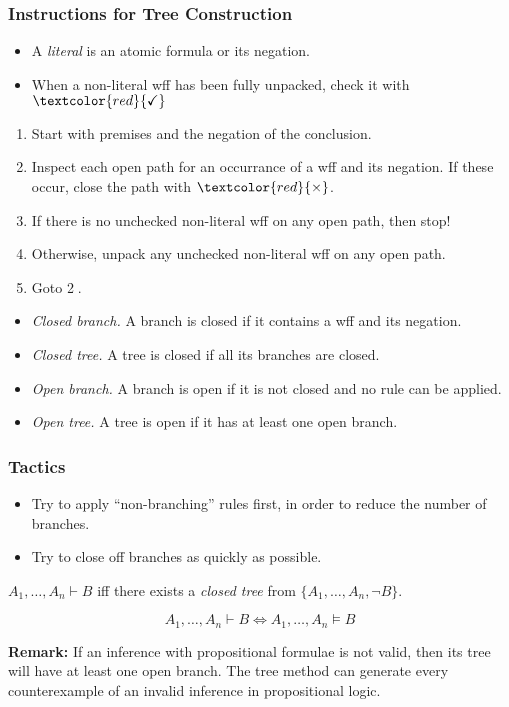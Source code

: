 \documentclass[UTF8,11pt,colorlinks,compress,openany]{beamer}%
\begin{document}
\begin{frame}\frametitle{Instructions for Tree Construction}
\begin{itemize}
	\item A \emph{literal} is an atomic formula or its negation.
	\item When a non-literal wff has been fully unpacked, check it with $\textcolor{red}{\checkmark}$
\end{itemize}
\begin{enumerate}
	\item Start with premises and the negation of the conclusion.
	\item Inspect each open path for an occurrance of a wff and its negation. If these occur, close the path with $\textcolor{red}{\times}$.
	\item If there is no unchecked non-literal wff on any open path, then stop!
	\item Otherwise, unpack any unchecked non-literal wff on any open path.
	\item Goto \textcircled{\footnotesize 2}.
\end{enumerate}
\begin{itemize}
	\item \emph{Closed branch.} A branch is closed if it contains a wff and its negation.
	\item \emph{Closed tree.} A tree is closed if all its branches are closed.
	\item \emph{Open branch.} A branch is open if it is not closed and no rule can be applied.
	\item \emph{Open tree.} A tree is open if it has at least one open branch.
\end{itemize}
\end{frame}

\begin{frame}\frametitle{Tactics}
\begin{itemize}
	\item Try to apply ``non-branching'' rules first, in order to reduce the number of branches.
	\item Try to close off branches as quickly as possible.
\end{itemize}
\begin{definition}[Deduction]
	$A_1,\dots, A_n\vdash B$ iff there exists a \emph{closed tree} from $\{A_1,\dots, A_n,\neg B\}$.
\end{definition}
\begin{theorem}
	\[A_1,\dots, A_n\vdash B\iff A_1,\dots, A_n\vDash B\]
\end{theorem}
	\textbf{Remark:} If an inference with propositional formulae is not valid, then its tree will have at least one open branch. The tree method can generate every counterexample of an invalid inference in propositional logic.
\end{frame}
\end{document}
